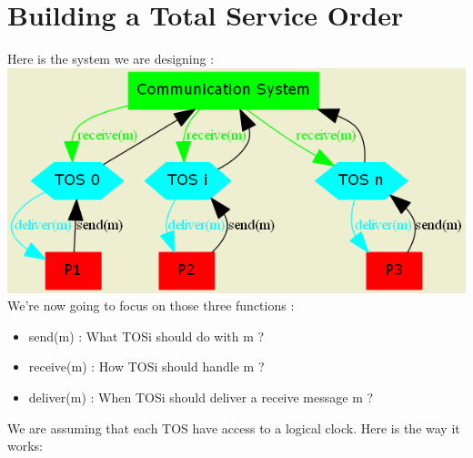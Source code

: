 \documentclass[a4paper,11pt]{article} %
\begin{document}
\section{Building a Total Service Order}
Here is the system we are designing : \\
\includegraphics[scale=0.6]{design.png}
We're now going to focus on those three functions : 
\begin{itemize}
\item send(m) : What TOSi should do with m ?
\item receive(m) : How TOSi should handle m ?
\item deliver(m) : When TOSi should deliver a receive message m ?
\end{itemize}We are assuming that each TOS have access to a logical clock.
Here is the way it works: 
\renewcommand{\labelenumi}{(\roman{enumi})}
\renewcommand{\labelenumii}{(\alph{enumii})}
\end{document}

